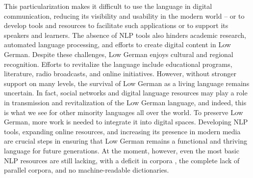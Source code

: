 This particularization makes it difficult to use the language in digital communication, reducing its visibility and usability in the modern world -- or to develop tools and resources to facilitate such applications or to support its speakers and learners. The absence of NLP tools also hinders academic research, automated language processing, and efforts to create digital content in Low German. Despite these challenges, Low German enjoys cultural and regional recognition. Efforts to revitalize the language include educational programs, literature, radio broadcasts, and online initiatives. However, without stronger support on many levels, the survival of Low German as a living language remains uncertain. In fact, social networks and digital language resources may play a role in transmission and revitalization of the Low German language, and indeed, this is what we see for other minority languages all over the world. To preserve Low German, more work is needed to integrate it into digital spaces. Developing NLP tools, expanding online resources, and increasing its presence in modern media are crucial steps in ensuring that Low German remains a functional and thriving language for future generations. At the moment, however, even the most basic NLP resources are still lacking, with a deficit in corpora \cite{siewert2021towards}, the complete lack of parallel corpora, and no machine-readable dictionaries. 

